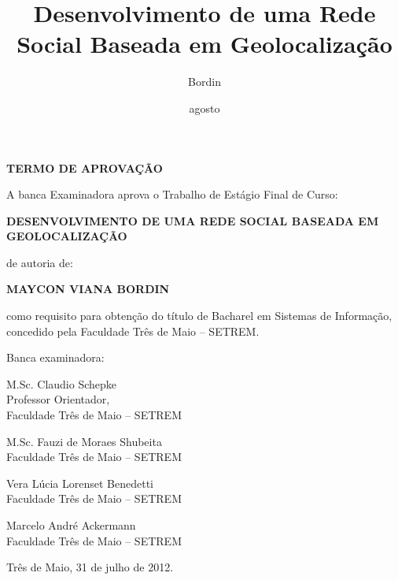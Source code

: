 \documentclass[diss]{template/setrem}
\title{Desenvolvimento de uma Rede Social Baseada em Geolocalização}
\author{Bordin}{Maycon Viana}
\date{agosto}{2012}
\begin{document}
\maketitle

\clearpage
    \noindent
    \begin{center}
        \textbf{\MakeUppercase{Termo de Aprovação}}\\
        
        \vspace{2cm}
        
        {A banca Examinadora aprova o Trabalho de Estágio Final de Curso:}
        
        \textbf{\MakeUppercase{Desenvolvimento de uma Rede Social Baseada em Geolocalização}}
        
        {de autoria de:}
        
        \textbf{\MakeUppercase{Maycon Viana Bordin}}
        
		{como requisito para obtenção do título de Bacharel em Sistemas de Informação, concedido pela Faculdade Três de Maio -- SETREM.}
		
		\vspace{1cm}
		
		{Banca examinadora:\hfill}
		
		\vspace{1cm}
		
		\begin{multicols}{2}
		\begin{flushleft}
		M.Sc. Claudio Schepke\\
		Professor Orientador,\\
		Faculdade Três de Maio -- SETREM\\
		\end{flushleft}
		
		\vspace{0.5cm}
		
		\begin{flushleft}
		M.Sc. Fauzi de Moraes Shubeita\\
		Faculdade Três de Maio -- SETREM\\
		\end{flushleft}
		
		\begin{flushright}
		Vera Lúcia Lorenset Benedetti\\
		Faculdade Três de Maio -- SETREM\\
		\end{flushright}
		
		\vspace{0.5cm}
		
		\begin{flushright}
		Marcelo André Ackermann\\
		Faculdade Três de Maio -- SETREM\\
		\end{flushright}
		\end{multicols}
		
		\vfill
		Três de Maio, 31 de julho de 2012.
    \end{center}
\end{document}
